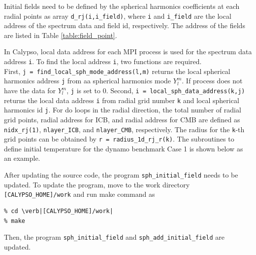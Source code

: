 Initial fields need to be defined by the spherical harmonics coefficients at each radial points as array \verb|d_rj(i,i_field)|, where \verb|i| and \verb|i_field| are the local address of the spectrum data and field id, respectively. The address of the fields are listed in Table \ref{table:field_point}.

In Calypso, local data address for each MPI process is used for the spectrum data address \verb|i|. To find the local address \verb|i|, two functions are required. \\
First, \verb|j = find_local_sph_mode_address(l,m)| returns the local spherical  harmonics address \verb|j| from aa spherical harmonics mode $Y_{l}^{m}$. If process does not have the data for $Y_{l}^{m}$, \verb|j| is set to 0. Second, \verb|i = local_sph_data_address(k,j)| returns the local data address \verb|i| from radial grid number \verb|k| and local spherical harmonics id \verb|j|. For do loops in the radial direction, the total number of radial grid points, radial address for ICB, and radial address for CMB are defined as \verb|nidx_rj(1)|, \verb|nlayer_ICB|, and \verb|nlayer_CMB|, respectively. The radius for the \verb|k|-th grid points can be obtained by \verb|r = radius_1d_rj_r(k)|. The subroutines to define initial temperature for the dynamo benchmark Case 1 is shown below as an example.

After updating the source code, the program \verb|sph_initial_field| needs to be updated. To update the program, move to the work directory \verb|[CALYPSO_HOME]/work| and run make command as
% 
\begin{verbatim}
% cd \verb|[CALYPSO_HOME]/work|
% make
\end{verbatim}
%
Then, the program  \verb|sph_initial_field| and  \verb|sph_add_initial_field| are updated.


